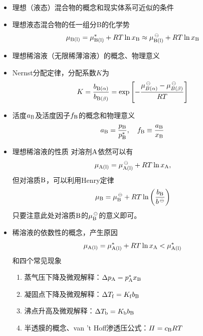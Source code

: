 \documentclass[9pt]{beamer}
\newcommand\A{{\rm A}}
\newcommand\B{{\rm B}}
\newcommand\bb{{\rm b}}
\newcommand\f{{\rm f}}
\begin{document}
	\begin{frame}
	
	\begin{itemize}
	
	\item 理想（液态）混合物的概念和现实体系可近似的条件
	
	\item 理想液态混合物的任一组分B的化学势
	\[
		\mu_{\B({\rm l})} = \mu^*_{\B({\rm l})} + RT \ln x_\B \approx \mu^{\,\ominus}_{\B({\rm l})} + RT \ln x_\B
	\]
	
	\item 理想稀溶液（无限稀薄溶液）的概念、物理意义
	
	\item Nernst分配定律，分配系数$K$为
	\[
		K = \frac{ b_{\B(\alpha)} }{ b_{\B( \beta )} } = \exp{\left[ -\frac{ \mu^{\,\ominus}_{B(\alpha)} - \mu^{\,\ominus}_{B(\beta)} }{ RT } \right]}
	\]
	
	\item 活度$a_\B$及活度因子$f_\B$的概念和物理意义
	\[
		a_\B = \frac{ p_\B }{ p^*_\B } , \quad f_\B \equiv \frac{ a_\B }{ x_\B }
	\]
	
	\item 理想稀溶液的性质
	对溶剂$\A$依然可以有
	\[
		\mu_{\A({\rm l})} = \mu^{\,\ominus}_{\A({\rm l})} + RT \ln x_\A,
	\]
	但对溶质$\B$，可以利用Henry定律
	\[
		\mu_\B = \mu^{\,\ominus}_\B + RT \ln \left( \frac{b_\B}{b^{\,\ominus}} \right)
	\]
	只要注意此处对溶质$\B$的$\mu^{\,\ominus}_\B$的意义即可。
	
	\end{itemize}		
	
	\end{frame}
	
	\begin{frame}
	
	\begin{itemize}
	
	\item 稀溶液的依数性的概念，产生原因
	\[
		\mu_{\A({\rm l})} = \mu^*_{\A({\rm l})} + RT \ln x_\A < \mu^*_{\A({\rm l})} 
	\]
	和四个常见现象
		\begin{enumerate}
	
		\item 蒸气压下降及微观解释：$\Delta p_\A = p^*_\A x_\B$
	
		\item 凝固点下降及微观解释：$\Delta T_\f = K_\f b_\B$
	
		\item 沸点升高及微观解释：$\Delta T_\bb = K_\bb b_\B$
	
		\item 半透膜的概念、van 't Hoff渗透压公式：$\varPi=c_\B RT$	
		\end{enumerate}	
	
	\end{itemize}
	
	\end{frame}
	
\end{document}
